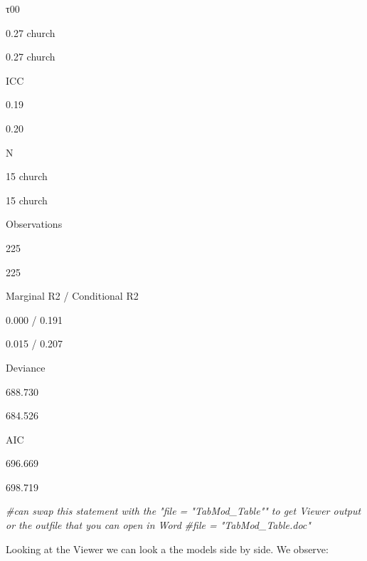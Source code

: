 \documentclass[
  11pt,
]{book}
\newenvironment{Shaded}{\begin{snugshade}}{\end{snugshade}}
\newcommand{\CommentTok}[1]{\textcolor[rgb]{0.56,0.35,0.01}{\textit{#1}}}
\begin{document}
τ00

0.27 church

0.27 church

ICC

0.19

0.20

N

15 church

15 church

Observations

225

225

Marginal R2 / Conditional R2

0.000 / 0.191

0.015 / 0.207

Deviance

688.730

684.526

AIC

696.669

698.719

\begin{Shaded}
\begin{Highlighting}[]
\CommentTok{\#can swap this statement with the "file = "TabMod\_Table"" to get Viewer output or the outfile that you can open in Word}
\CommentTok{\#file = "TabMod\_Table.doc"}
\end{Highlighting}
\end{Shaded}

Looking at the Viewer we can look a the models side by side. We observe:
\end{document}
